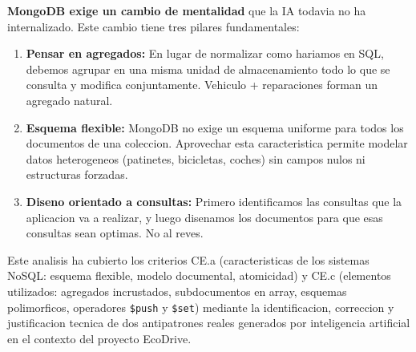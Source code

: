 \textbf{MongoDB exige un cambio de mentalidad} que la IA todavia no ha internalizado. Este cambio tiene tres pilares fundamentales:

\begin{enumerate}
    \item \textbf{Pensar en agregados:} En lugar de normalizar como hariamos en SQL, debemos agrupar en una misma unidad de almacenamiento todo lo que se consulta y modifica conjuntamente. Vehiculo + reparaciones forman un agregado natural.
    \item \textbf{Esquema flexible:} MongoDB no exige un esquema uniforme para todos los documentos de una coleccion. Aprovechar esta caracteristica permite modelar datos heterogeneos (patinetes, bicicletas, coches) sin campos nulos ni estructuras forzadas.
    \item \textbf{Diseno orientado a consultas:} Primero identificamos las consultas que la aplicacion va a realizar, y luego disenamos los documentos para que esas consultas sean optimas. No al reves.
\end{enumerate}

Este analisis ha cubierto los criterios CE.a (caracteristicas de los sistemas NoSQL: esquema flexible, modelo documental, atomicidad) y CE.c (elementos utilizados: agregados incrustados, subdocumentos en array, esquemas polimorficos, operadores \texttt{\$push} y \texttt{\$set}) mediante la identificacion, correccion y justificacion tecnica de dos antipatrones reales generados por inteligencia artificial en el contexto del proyecto EcoDrive.
